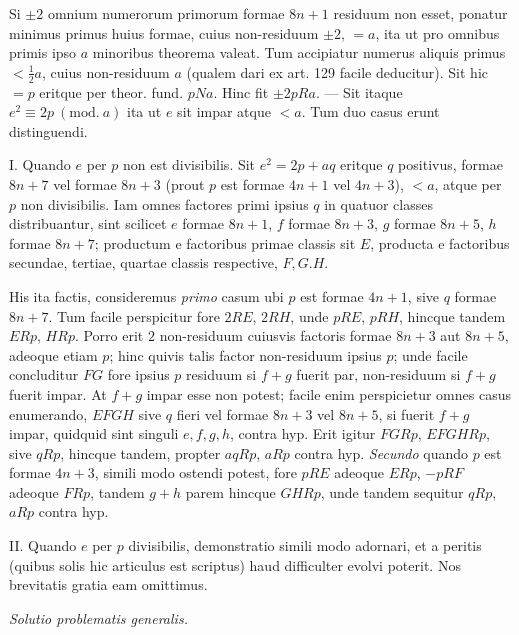 Si $\pm2$ omnium numerorum primorum formae $8n+1$ residuum non esset, ponatur minimus primus huius formae, cuius non-residuum $\pm2$, $=a$, ita ut pro omnibus primis ipso $a$ minoribus theorema valeat. Tum accipiatur numerus aliquis primus $<\frac{1}{2}a$, cuius non-residuum $a$ (qualem dari ex art. 129 facile deducitur). Sit hic $=p$ eritque per theor. fund. $pNa$. Hinc fit $\pm2pRa$. --- Sit itaque $e^2\equiv2p\ (\mathrm{mod.}\ a)$ ita ut $e$ sit impar atque $<a$. Tum duo casus erunt distinguendi.

I. Quando $e$ per $p$ non est divisibilis. Sit $e^2=2p+aq$ eritque $q$ positivus, formae $8n+7$ vel formae $8n+3$ (prout $p$ est formae $4n+1$ vel $4n+3$), $<a$, atque per $p$ non divisibilis. Iam omnes factores primi ipsius $q$ in quatuor classes distribuantur, sint scilicet $e$ formae $8n+1$, $f$ formae $8n+3$, $g$ formae $8n+5$, $h$ formae $8n+7$; productum e factoribus primae classis sit $E$, producta e factoribus secundae, tertiae, quartae classis respective, $F,G.H$.

His ita factis, consideremus \textit{primo} casum ubi $p$ est formae $4n+1$, sive $q$ formae $8n+7$. Tum facile perspicitur fore $2RE$, $2RH$, unde $pRE$, $pRH$, hincque tandem $ERp$, $HRp$. Porro erit $2$ non-residuum cuiusvis factoris formae $8n+3$ aut $8n+5$, adeoque etiam $p$; hinc quivis talis factor non-residuum ipsius $p$; unde facile concluditur $FG$ fore ipsius $p$ residuum si $f+g$ fuerit par, non-residuum si $f+g$ fuerit impar. At $f+g$ impar esse non potest; facile enim perspicietur omnes casus enumerando, $EFGH$ sive $q$ fieri vel formae $8n+3$ vel $8n+5$, si fuerit $f+g$ impar, quidquid sint singuli $e,f,g,h$, contra hyp. Erit igitur $FGRp$, $EFGHRp$, sive $qRp$, hincque tandem, propter $aqRp$, $aRp$ contra hyp. \textit{Secundo} quando $p$ est formae $4n+3$, simili modo ostendi potest, fore $pRE$ adeoque $ERp$, $-pRF$ adeoque $FRp$, tandem $g+h$ parem hincque $GHRp$, unde tandem sequitur $qRp$, $aRp$ contra hyp.

II. Quando $e$ per $p$ divisibilis, demonstratio simili modo adornari, et a peritis (quibus solis hic articulus est scriptus) haud difficulter evolvi poterit. Nos brevitatis gratia eam omittimus.

\begin{center}
\textit{Solutio problematis generalis.}
\end{center}


